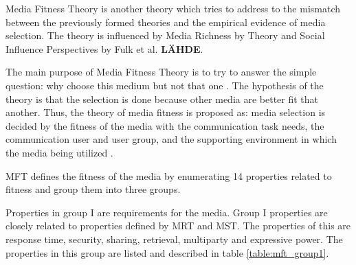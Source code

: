 \documentclass[english,12pt,a4paper,pdftex]{article}
\begin{document}
Media Fitness Theory is another theory which tries to address to the mismatch between the previously formed theories and the empirical evidence of media selection. The theory is influenced by Media Richness by \citet{daft1986} Theory and Social Influence Perspectives by Fulk et al. \textbf{LÄHDE}.

The main purpose of Media Fitness Theory is to try to answer the simple question: why choose this medium but not that one \citep{higa2007}. The hypothesis of the theory is that the selection is done because other media are better fit that another. Thus, the theory of media fitness is proposed as: media selection is decided by the fitness of the media with the communication task needs, the communication user and user group, and the supporting environment in which the media being utilized \citep{higa2007}.

MFT defines the fitness of the media by enumerating 14 properties related to fitness and group them into three groups. 

Properties in group I are requirements for the media. Group I properties are closely related to properties defined by MRT and MST. The properties of this are response time, security, sharing, retrieval, multiparty and expressive power. The properties in this group are listed and described in table \ref{table:mft_group1}.
\end{document}
